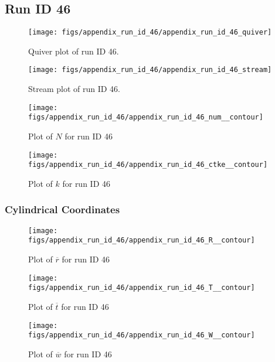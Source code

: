 \subsection{Run ID 46}
\begin{figure}[H]
\centering
\texttt{[image: figs/appendix\_run\_id\_46/appendix\_run\_id\_46\_quiver]}
\caption{Quiver plot of run ID 46.}
\label{fig:appendix_run_id_46_quiver}
\end{figure}


\begin{figure}[H]
\centering
\texttt{[image: figs/appendix\_run\_id\_46/appendix\_run\_id\_46\_stream]}
\caption{Stream plot of run ID 46.}
\label{fig:appendix_run_id_46_stream}
\end{figure}


\begin{figure}[H]
\centering
\texttt{[image: figs/appendix\_run\_id\_46/appendix\_run\_id\_46\_num\_\_contour]}
\caption{Plot of $N$ for run ID 46}
\label{fig:appendix_run_id_46_num__contour}
\end{figure}


\begin{figure}[H]
\centering
\texttt{[image: figs/appendix\_run\_id\_46/appendix\_run\_id\_46\_ctke\_\_contour]}
\caption{Plot of $k$ for run ID 46}
\label{fig:appendix_run_id_46_ctke__contour}
\end{figure}


\subsubsection{Cylindrical Coordinates}
\begin{figure}[H]
\centering
\texttt{[image: figs/appendix\_run\_id\_46/appendix\_run\_id\_46\_R\_\_contour]}
\caption{Plot of $\overline{r}$ for run ID 46}
\label{fig:appendix_run_id_46_R__contour}
\end{figure}


\begin{figure}[H]
\centering
\texttt{[image: figs/appendix\_run\_id\_46/appendix\_run\_id\_46\_T\_\_contour]}
\caption{Plot of $\overline{t}$ for run ID 46}
\label{fig:appendix_run_id_46_T__contour}
\end{figure}


\begin{figure}[H]
\centering
\texttt{[image: figs/appendix\_run\_id\_46/appendix\_run\_id\_46\_W\_\_contour]}
\caption{Plot of $\overline{w}$ for run ID 46}
\label{fig:appendix_run_id_46_W__contour}
\end{figure}


